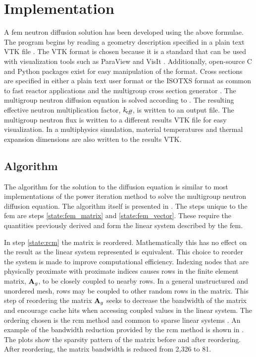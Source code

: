 \section{Implementation}
  A \gls{fem} neutron diffusion solution has been developed using 
  the above formulae. The program begins by reading a geometry description 
  specified in a plain text VTK file \cite{vtk}. The VTK format is chosen 
  because it is a standard that can be used with visualization tools such as 
  ParaView \cite{ParaView} and VisIt \cite{VisIt}. Additionally, open-source C 
  and Python packages exist for easy manipulation of the format. Cross sections
  are specified in either a plain text user format or the ISOTXS format as 
  common to fast reactor applications and the multigroup cross section generator
  \mcc \cite{mcc}. The multigroup neutron diffusion equation is solved according
  to . The resulting effective neutron multiplication 
  factor, $k_{\!\mbox{\scriptsize \em eff}}$, is written to an output file. The multigroup neutron flux is
  written to a different results VTK file for easy visualization. In a
  multiphysics simulation, material temperatures and thermal expansion
  dimensions are also written to the results VTK.

  \subsection{Algorithm}
    The algorithm for the solution to the diffusion equation is similar to most
    implementations of the power iteration method to solve the multigroup
    neutron diffusion equation. The algorithm itself is presented in 
    . The steps unique to the \gls{fem} are 
    steps \ref{state:fem_matrix} and \ref{state:fem_vector}. These require the 
    quantities previously derived and form the linear system described by the 
    \gls{fem}. 

    In step \ref{state:rcm} the matrix is reordered. Mathematically this has no
    effect on the result as the linear system represented is equivalent. This 
    choice to reorder the system is made to improve computational efficiency. 
    Indexing nodes that are physically proximate with proximate indices causes 
    rows in the finite element matrix, $\mathbf{A}_g$, to be closely coupled to nearby
    rows. In a general unstructured and unordered mesh, rows may be coupled to 
    other random rows in the matrix. This step of reordering the matrix $\mathbf{A}_g$ 
    seeks to decrease the bandwidth of the matrix and encourage cache hits when
    accessing coupled values in the linear system. The ordering chosen is the
    \gls{rcm} method and common to sparse linear systems
    \cite{rcm}. An example of the bandwidth reduction provided by the \gls{rcm}
    method is shown in . The plots show the
    sparsity pattern of the matrix before and after reordering. After
    reordering, the matrix bandwidth is reduced from 2,326 to 81.

